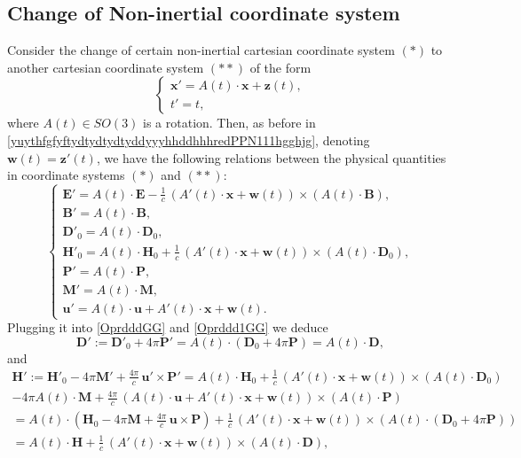 \documentclass{article}
\theoremstyle{definition}
\theoremstyle{remark}
\renewcommand{\vec}[1]{\mathbf{#1}}
\newcommand{\R}{\mathbb{R}}
\newcommand{\er}{\eqref}
\newcommand{\R}{{\mathbb{R}}}
\newcommand{\er}{\eqref}
\begin{document}
\subsection{Change of Non-inertial coordinate system} Consider the
change of certain non-inertial cartesian coordinate system $(*)$ to
another cartesian coordinate system $(**)$ of the form
\begin{equation*}
\begin{cases}
\vec x'=A(t)\cdot \vec x+\vec z(t),\\
t'=t,
\end{cases}
\end{equation*}
where $A(t)\in SO(3)$ is a rotation. Then, as before in
\er{yuythfgfyftydtydtydtyddyyyhhddhhhredPPN111hgghjg}, denoting
$\vec w(t)=\vec z'(t)$, we have the following relations between the
physical quantities in coordinate systems $(*)$ and $(**)$:
\begin{equation}\label{guigikvbvbGG}
\begin{cases}
\vec E'=A(t)\cdot\vec E-\frac{1}{c}\,\left(A'(t)\cdot\vec x+\vec
w(t)\right)\times \left(A(t)\cdot\vec B\right),\\
\vec B'=A(t)\cdot\vec B,\\
\vec D'_0=A(t)\cdot \vec D_0,\\
\vec H'_0=A(t)\cdot\vec H_0+\frac{1}{c}\,\left(A'(t)\cdot\vec x+\vec
w(t)\right)\times \left(A(t)\cdot\vec D_0\right),\\
\vec P'=A(t)\cdot\vec P,\\
\vec M'=A(t)\cdot\vec M,\\
\vec u'=A(t)\cdot \vec u+A'(t)\cdot\vec x+\vec w(t).
\end{cases}
\end{equation}
Plugging it into \er{OprdddGG} and \er{Oprddd1GG} we deduce
\begin{equation}\label{OprdddkkkmGG}
\vec D':=\vec D'_0+4\pi \vec P'=A(t)\cdot\left(\vec D_0+4\pi \vec
P\right)=A(t)\cdot\vec D,
\end{equation}
and
\begin{multline}\label{Oprddd1kkkmGG}
\vec H':=\vec H'_0-4\pi \vec M'+\frac{4\pi}{c}\,\vec u'\times \vec
P'=A(t)\cdot\vec H_0+\frac{1}{c}\,\left(A'(t)\cdot\vec x+\vec
w(t)\right)\times \left(A(t)\cdot\vec D_0\right)\\-4\pi
A(t)\cdot\vec M+\frac{4\pi}{c}\,\left(A(t)\cdot \vec
u+A'(t)\cdot\vec x+\vec
w(t)\right)\times \left(A(t)\cdot\vec P\right)\\
=A(t)\cdot\left(\vec H_0-4\pi \vec M+\frac{4\pi}{c}\,\vec u\times
\vec P\right)+\frac{1}{c}\,\left(A'(t)\cdot\vec x+\vec
w(t)\right)\times \left(A(t)\cdot\left(\vec D_0+4\pi\vec
P\right)\right)\\= A(t)\cdot\vec H+\frac{1}{c}\,\left(A'(t)\cdot\vec
x+\vec w(t)\right)\times \left(A(t)\cdot\vec D\right) ,
\end{multline}
\end{document}
